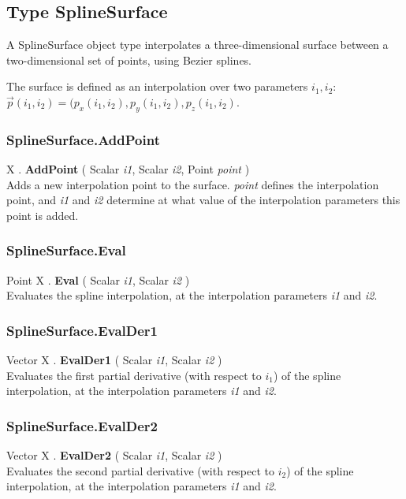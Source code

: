 \documentclass[10pt]{book}
\newcommand{\var}[1]{\textit{#1}}
\begin{document}
\subsection{Type SplineSurface \label{T:SplineSurface}}
A SplineSurface object type interpolates a three-dimensional surface between a two-dimensional set of points, using Bezier splines.

The surface  is defined as an interpolation over two parameters $i_1, i_2$:
$\vec{p}(i_1,i_2)=(p_x(i_1,i_2),p_y(i_1,i_2),p_z(i_1,i_2)$.


\subsubsection{SplineSurface.AddPoint \label{F:SplineSurface:AddPoint}}
X . \textbf{AddPoint} ( Scalar \textit{i1}, Scalar \textit{i2}, Point \textit{point} ) \\
Adds a new interpolation point to the surface. \var{point} defines the interpolation point, and \var{i1} and \var{i2} determine at what value of the interpolation parameters this point is added.


\subsubsection{SplineSurface.Eval \label{F:SplineSurface:Eval}}
Point X . \textbf{Eval} ( Scalar \textit{i1}, Scalar \textit{i2} ) \\
Evaluates the spline interpolation, at the interpolation parameters \var{i1} and \var{i2}.


\subsubsection{SplineSurface.EvalDer1 \label{F:SplineSurface:EvalDer1}}
Vector X . \textbf{EvalDer1} ( Scalar \textit{i1}, Scalar \textit{i2} ) \\
Evaluates the first partial derivative (with respect to $i_1$) of the spline interpolation, at the interpolation parameters \var{i1} and \var{i2}.



\subsubsection{SplineSurface.EvalDer2 \label{F:SplineSurface:EvalDer2}}
Vector X . \textbf{EvalDer2} ( Scalar \textit{i1}, Scalar \textit{i2} ) \\
Evaluates the second partial derivative (with respect to $i_2$) of the spline interpolation, at the interpolation parameters \var{i1} and \var{i2}.
\end{document}

